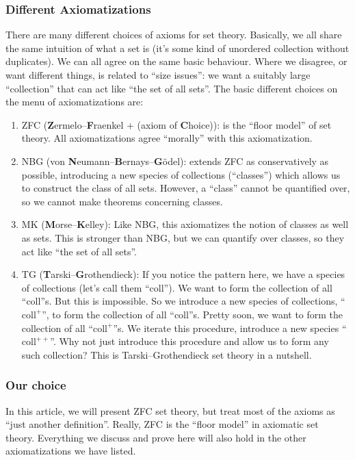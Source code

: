 \subsubsection{Different Axiomatizations}
There are many different choices of axioms for set theory. Basically, we
all share the same intuition of what a set is (it's some kind of
unordered collection without duplicates). We can all agree on the same
basic behaviour. Where we disagree, or want different things, is related
to ``size issues'': we want a suitably large ``collection'' that can act
like ``the set of all sets''. The basic different choices on the menu of
axiomatizations are:
\begin{enumerate}
\item ZFC (\textbf{Z}ermelo--\textbf{F}raenkel + (axiom of \textbf{C}hoice)):
  is the ``floor model'' of set theory. All axiomatizations agree
  ``morally'' with this axiomatization.
\item NBG (von \textbf{N}eumann--\textbf{B}ernays--\textbf{G}\"{o}del):
  extends ZFC as conservatively as possible, introducing a new  species
  of collections (``classes'') which allows us to construct the class of
  all sets. However, a ``class'' cannot be quantified over, so we cannot
  make theorems concerning classes.
\item MK (\textbf{M}orse--\textbf{K}elley): Like NBG, this axiomatizes
  the notion of classes as well as sets. This is stronger than NBG, but
  we can quantify over classes, so they act like ``the set of all sets''.
\item TG (\textbf{T}arski--\textbf{G}rothendieck): If you notice the
  pattern here, we have a species of collections (let's call them ``coll'').
  We want to form the collection of all ``coll''s. But this is
  impossible. So we introduce a new species of collections,
  ``$\mbox{coll}^{+}$'', to form the collection of all ``coll''s. Pretty
  soon, we want to form the collection of all ``$\mbox{coll}^{+}$''s. We
  iterate this procedure, introduce a new species ``$\mbox{coll}^{++}$''.
  Why not just introduce this procedure and allow us to form any such
  collection? This is Tarski--Grothendieck set theory in a nutshell.
\end{enumerate}

\subsubsection{Our choice}
In this article, we will present ZFC set theory, but treat most of the
axioms as ``just another definition''. Really, ZFC is the ``floor model''
in axiomatic set theory. Everything we discuss and prove here will also
hold in the other axiomatizations we have listed.

